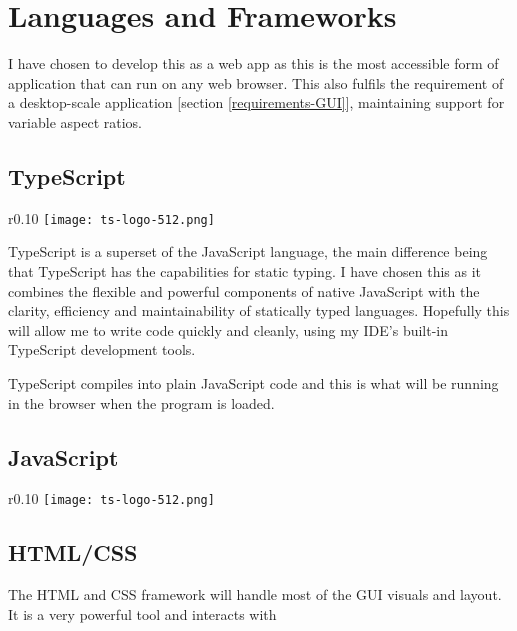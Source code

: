 \section{Languages and Frameworks}

    I have chosen to develop this as a web app as this is the most accessible form of application that can run on any web browser. This also fulfils the requirement of a desktop-scale application [section \ref{requirements-GUI}], maintaining support for variable aspect ratios.

    \subsection{TypeScript}

        \begin{wrapfigure}{r}{0.10\textwidth}
            \centering
            \texttt{[image: ts-logo-512.png]}
        \end{wrapfigure}

        TypeScript \cite{typescript} is a superset of the JavaScript language, the main difference being that TypeScript has the capabilities for static typing. I have chosen this as it combines the flexible and powerful components of native JavaScript with the clarity, efficiency and maintainability of statically typed languages. Hopefully this will allow me to write code quickly and cleanly, using my IDE's built-in TypeScript development tools.

        TypeScript compiles into plain JavaScript code and this is what will be running in the browser when the program is loaded.

    \subsection{JavaScript}

    \begin{wrapfigure}{r}{0.10\textwidth}
        \centering
        \texttt{[image: ts-logo-512.png]}
    \end{wrapfigure}

    \subsection{HTML/CSS}

        The HTML and CSS framework will handle most of the GUI visuals and layout. It is a very powerful tool and interacts with

